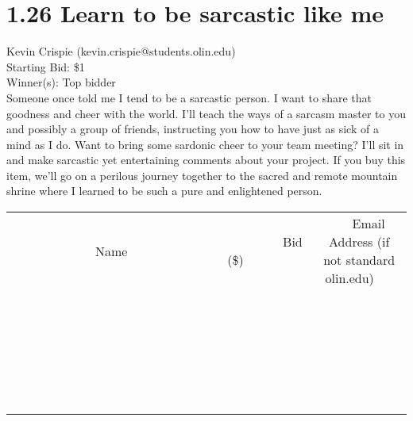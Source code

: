 \documentclass[11pt]{article}
\begin{document}
\section*{1.26 Learn to be sarcastic like me}
Kevin Crispie (kevin.crispie@students.olin.edu) \\
Starting Bid: \$1 \\
Winner(s): 
Top bidder \\
Someone once told me I tend to be a sarcastic person. I want to share that goodness and cheer with the world. I’ll teach the ways of a sarcasm master to you and possibly a group of friends, instructing you how to have just as sick of a mind as I do. Want to bring some sardonic cheer to your team meeting? I’ll sit in and make sarcastic yet entertaining comments about your project. If you buy this item, we’ll go on a perilous journey together to the sacred and remote mountain shrine where I learned to be such a pure and enlightened person. \\[6ex]
\begin{tabular}{c c c}
~~~~~~~~~~~~~Name~~~~~~~~~~~~~ & ~~~~~~~~~Bid (\$)~~~~~~~~~ & ~~~Email Address (if not standard olin.edu)~~~ \\
 & & \\
\hline
 & & \\
\hline
 & & \\
\hline
 & & \\
\hline
 & & \\
\hline
 & & \\
\hline
 & & \\
\hline
 & & \\
\hline
 & & \\
\hline
 & & \\
\hline
 & & \\
\hline
 & & \\
\hline
 & & \\
\hline
 & & \\
\hline
 & & \\
\hline
 & & \\
\hline
 & & \\
\hline
 & & \\
\hline
 & & \\
\hline
 & & \\
\hline
 & & \\
\hline
 & & \\
\hline
 & & \\
\hline
 & & \\
\hline
 & & \\
\hline
 & & \\
\hline
\end{tabular}
\clearpage
\end{document}
